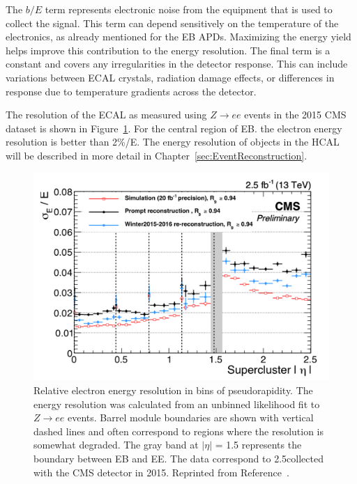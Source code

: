 The $b/E$ term represents electronic noise from the equipment that is used to collect the signal. This term can depend sensitively on the temperature of the electronics, as already mentioned for the EB APDs. Maximizing the energy yield helps improve this contribution to the energy resolution. The final term is a constant and covers any irregularities in the detector response. This can include variations between ECAL crystals, radiation damage effects, or differences in response due to temperature gradients across the detector.

The resolution of the ECAL as measured using $Z\rightarrow ee$ events in the 2015 CMS dataset is shown in Figure~\ref{fig:ecal_resolution}. For the central region of EB. the electron energy resolution is better than 2\%/E. The energy resolution of objects in the HCAL will be described in more detail in Chapter~\ref{sec:EventReconstruction}.

\begin{figure}[h!]
	\centering
	\includegraphics[width=\linewidth]{Figures/Detector/EcalEnergyResolution.png}
       \caption{Relative electron energy resolution in bins of pseudorapidity. 
       The energy resolution was calculated from an unbinned likelihood fit to $Z\rightarrow ee$ events.
        Barrel module boundaries are shown with vertical dashed lines and often correspond to regions where the resolution is somewhat degraded. The gray band at $|\eta|$ = 1.5 represents the boundary between EB and EE.
        The data correspond to 2.5\fbinv collected with the CMS detector in 2015.
        Reprinted from Reference~\cite{ECALDPGtwiki2}.}
         \label{fig:ecal_resolution}
\end{figure}

